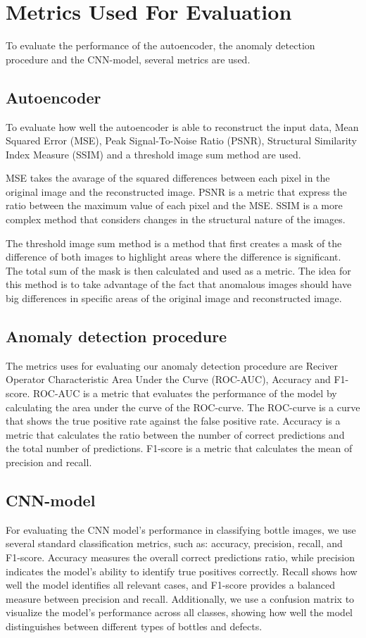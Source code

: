 \section{Metrics Used For Evaluation}

To evaluate the performance of the autoencoder, the anomaly detection procedure and the CNN-model, several metrics are used. 

\subsection{Autoencoder}

To evaluate how well the autoencoder is able to reconstruct the input data,  Mean Squared Error (MSE), Peak Signal-To-Noise Ratio (PSNR), Structural Similarity Index Measure (SSIM) and a threshold image sum method are used. 
\par
MSE takes the avarage of the squared differences between each pixel in the original image and the reconstructed image. PSNR is a metric that express the ratio between the maximum value of each pixel and the MSE. SSIM is a more complex method that considers changes in the structural nature of the images. 
\par
The threshold image sum method is a method that first creates a mask of the difference of both images to highlight areas where the difference is significant. The total sum of the mask is then calculated and used as a metric. The idea for this method is to take advantage of the fact that anomalous images should have big differences in specific areas of the original image and reconstructed image.

\subsection{Anomaly detection procedure}

The metrics uses for evaluating our anomaly detection procedure are Reciver Operator Characteristic Area Under the Curve (ROC-AUC), Accuracy and F1-score. ROC-AUC is a metric that evaluates the performance of the model by calculating the area under the curve of the ROC-curve. The ROC-curve is a curve that shows the true positive rate against the false positive rate. Accuracy is a metric that calculates the ratio between the number of correct predictions and the total number of predictions. F1-score is a metric that calculates the mean of precision and recall.

\subsection{CNN-model}
For evaluating the CNN model's performance in classifying bottle images, we use several standard classification metrics, such as: accuracy, precision, recall, and F1-score.
Accuracy measures the overall correct predictions ratio, while precision indicates the model's ability to identify true positives correctly. 
Recall shows how well the model identifies all relevant cases, and F1-score provides a balanced measure between precision and recall. Additionally, we use a confusion matrix to visualize the model's performance across all classes, showing how well the model distinguishes between different types of bottles and defects.

